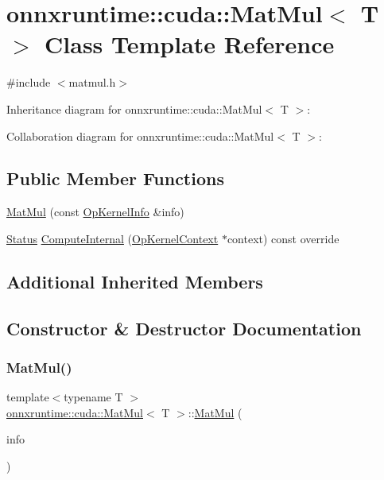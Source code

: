 \hypertarget{classonnxruntime_1_1cuda_1_1MatMul}{}\section{onnxruntime\+:\+:cuda\+:\+:Mat\+Mul$<$ T $>$ Class Template Reference}
\label{classonnxruntime_1_1cuda_1_1MatMul}


{\ttfamily \#include $<$matmul.\+h$>$}



Inheritance diagram for onnxruntime\+:\+:cuda\+:\+:Mat\+Mul$<$ T $>$\+:


Collaboration diagram for onnxruntime\+:\+:cuda\+:\+:Mat\+Mul$<$ T $>$\+:
\subsection*{Public Member Functions}
\begin{DoxyCompactItemize}
\item 
\mbox{\hyperlink{classonnxruntime_1_1cuda_1_1MatMul_aa40bcf70dfb473985262d2016ab36d9e}{Mat\+Mul}} (const \mbox{\hyperlink{classonnxruntime_1_1OpKernelInfo}{Op\+Kernel\+Info}} \&info)
\item 
\mbox{\hyperlink{classonnxruntime_1_1common_1_1Status}{Status}} \mbox{\hyperlink{classonnxruntime_1_1cuda_1_1MatMul_a78ef9bfa2814c487d9ef0a726601b6dc}{Compute\+Internal}} (\mbox{\hyperlink{classonnxruntime_1_1OpKernelContext}{Op\+Kernel\+Context}} $\ast$context) const override
\end{DoxyCompactItemize}
\subsection*{Additional Inherited Members}


\subsection{Constructor \& Destructor Documentation}
\mbox{\label{classonnxruntime_1_1cuda_1_1MatMul_aa40bcf70dfb473985262d2016ab36d9e}} 
\subsubsection{\texorpdfstring{Mat\+Mul()}{MatMul()}}
{\footnotesize\ttfamily template$<$typename T $>$ \\
\mbox{\hyperlink{classonnxruntime_1_1cuda_1_1MatMul}{onnxruntime\+::cuda\+::\+Mat\+Mul}}$<$ T $>$\+::\mbox{\hyperlink{classonnxruntime_1_1cuda_1_1MatMul}{Mat\+Mul}} (\begin{DoxyParamCaption}\item[{const \mbox{\hyperlink{classonnxruntime_1_1OpKernelInfo}{Op\+Kernel\+Info}} \&}]{info }\end{DoxyParamCaption})\hspace{0.3cm}{\ttfamily [inline]}}



